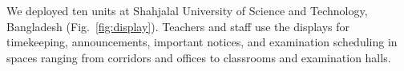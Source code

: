 We deployed ten units at Shahjalal University of Science and Technology, Bangladesh (Fig.~\ref{fig:display}). Teachers and staff use the displays for timekeeping, announcements, important notices, and examination scheduling in spaces ranging from corridors and offices to classrooms and examination halls.